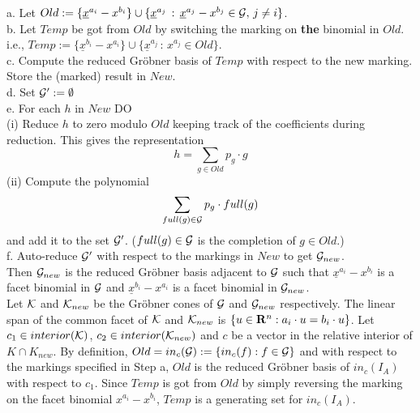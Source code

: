 \documentclass[11pt]{article}
\begin{document}
\indent \indent \indent a. Let $Old := 
\{{\underline x^{a_i}}-x^{b_i}\} \cup \{{\underline x^{a_j}} \, : \, 
            {\underline x^{a_j}}-x^{b_j} \in {\cal G},\, j \neq i \}$.\\
\indent \indent \indent b. Let $Temp$ be got from 
$Old$ by switching the marking on {\bf the} binomial in $Old$.\\
\indent \indent \indent \indent i.e., 
$Temp := \{ {\underline x^{b_i}}-x^{a_i} \} \cup  
\{{\underline x^{a_j}} \, : \, x^{a_j} \in Old \}$. \\
\indent \indent \indent c. Compute the reduced Gr\"obner basis 
of $Temp$ with respect to the new marking. 
\indent \indent \indent \indent Store the (marked) 
result in $New$.\\
\indent \indent \indent d. Set ${\cal G}' := \emptyset$\\
\indent \indent \indent e. For each $h$ in $New$ DO\\
\indent \indent \indent \indent (i) Reduce $h$ to zero modulo 
$Old$ keeping track of the coefficients during reduction. 
\indent \indent \indent \indent \indent This gives the representation 
\[ h = \sum_{g \in Old} p_g \cdot g \]
\indent \indent \indent \indent (ii) Compute the polynomial 
\[ \sum_{full(g) \in {\cal G}} p_g \cdot full(g) \]
\indent \indent \indent \indent \indent and add it to the set ${\cal G}'$.
($full(g) \in {\cal G}$ is the completion of $g \in Old$.)\\
\indent \indent \indent f. Auto-reduce ${\cal G}'$ with respect 
to the markings in $New$ to get ${\cal G}_{new}$. \\
Then ${\cal G}_{new}$ is the reduced Gr\"obner 
basis adjacent to ${\cal G}$ such that ${\underline x^{a_i}} -
x^{b_i}$ is a facet binomial in ${\cal G}$ and ${\underline x^{b_i}} -
x^{a_i}$ is a facet binomial in ${\cal G}_{new}$.\\

 Let ${\cal K}$ and ${\cal
K}_{new}$ be the Gr\"obner cones of ${\cal G}$ and ${\cal G}_{new}$
respectively. The linear span of the common facet of 
${\cal K}$ and ${\cal K}_{new}$ is $\{u \in {\bf R}^n : a_i \cdot u 
= b_i \cdot u \}$. Let $c_1 \in interior({\cal K})$, 
$c_2 \in interior({\cal K}_{new})$ and $c$ be a vector in the relative
interior of $K \cap K_{new}$. By definition, $Old = in_c({\cal G}) := 
\{ in_c(f) : f \in {\cal G} \}$
and with respect to the markings specified in Step a, $Old$ is the
reduced Gr\"obner basis of $in_c(I_A)$ with respect to $c_1$. Since
$Temp$ is got from $Old$ by simply reversing the marking on the facet
binomial $x^{a_i} - x^{b_i}$, $Temp$ is a generating set for $in_c(I_A)$. 
\end{document}
